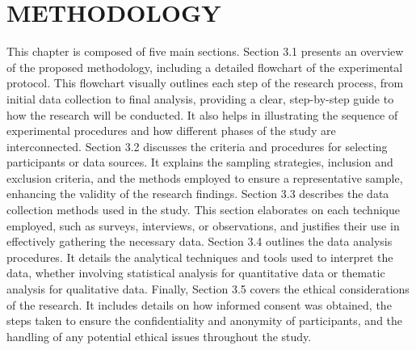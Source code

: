 \chapter{METHODOLOGY}

This chapter is composed of five main sections. Section 3.1 presents an overview of the proposed methodology, including a detailed flowchart of the experimental protocol. This flowchart visually outlines each step of the research process, from initial data collection to final analysis, providing a clear, step-by-step guide to how the research will be conducted. It also helps in illustrating the sequence of experimental procedures and how different phases of the study are interconnected. Section 3.2 discusses the criteria and procedures for selecting participants or data sources. It explains the sampling strategies, inclusion and exclusion criteria, and the methods employed to ensure a representative sample, enhancing the validity of the research findings. Section 3.3 describes the data collection methods used in the study. This section elaborates on each technique employed, such as surveys, interviews, or observations, and justifies their use in effectively gathering the necessary data. Section 3.4 outlines the data analysis procedures. It details the analytical techniques and tools used to interpret the data, whether involving statistical analysis for quantitative data or thematic analysis for qualitative data. Finally, Section 3.5 covers the ethical considerations of the research. It includes details on how informed consent was obtained, the steps taken to ensure the confidentiality and anonymity of participants, and the handling of any potential ethical issues throughout the study.



